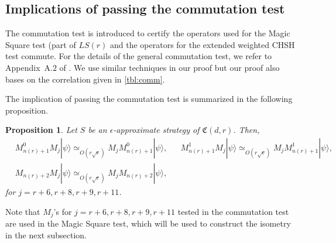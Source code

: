 \documentclass[11pt,letterpaper]{article}
\newcommand{\ket}[1]{|#1\rangle}
\newcommand{\1}{\mathbb{1}}
\newcommand{\LS}{LS}
\newcommand{\nr}{n(r)}
\newcommand{\fC}{\mathfrak{C}}
\newcommand{\ep}{\epsilon}
\newcommand{\se}{\sqrt{\epsilon}}
\newcommand{\appd}[1]{\simeq_{#1}}
\newtheorem{proposition}[theorem]{Proposition}
\theoremstyle{definition}
\begin{document}
\subsection{Implications of passing the commutation test}
\label{sec:imp_comm}
The commutation test is introduced to certify the operators used for the Magic Square test (part of $\LS(r)$ and 
the operators for the extended weighted CHSH test commute. For the details of the general commutation test, 
we refer to Appendix~A.$2$ of \cite{coladan2017verifier}. 
We use similar techniques in our proof but our proof also bases on the correlation given in \cref{tbl:comm}.

The implication of passing the commutation test is summarized in the following proposition.
\begin{proposition}
	\label{prop:rel_comm}
	Let $S$ be an $\ep$-approximate strategy of $\fC(d,r)$.
	Then, 
	\begin{align}
		&M_{\nr+1}^0 M_j \ket{\psi} \appd{O(r\se)} M_{j} M_{\nr+1}^0 \ket{\psi}, &&
		M_{\nr+1}^1 M_j \ket{\psi} \appd{O(r\se)} M_{j} M_{\nr+1}^1 \ket{\psi}, \\
		&M_{\nr+2} M_j \ket{\psi} \appd{O(r\se)} M_j M_{\nr+2} \ket{\psi},
	\end{align}
	for $j = r+6, r+8,r+9,r+11$.
\end{proposition}
Note that $M_j$'s for $j = r+6, r+8,r+9,r+11$ tested in the commutation test are used in the Magic Square test,
which will be used to construct the isometry in the next subsection.
\end{document}
